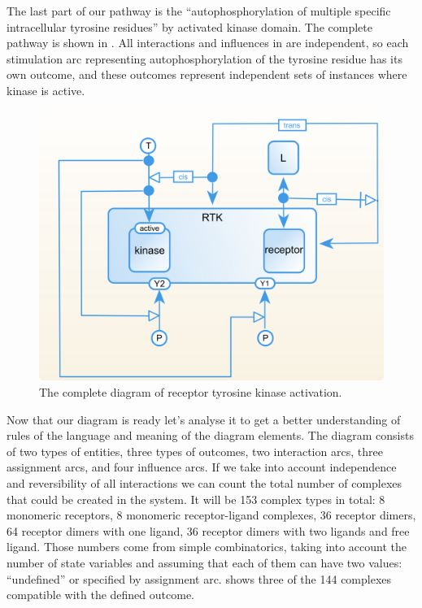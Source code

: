 The last part of our pathway is the ``autophosphorylation of multiple specific intracellular tyrosine residues'' by activated kinase domain. The complete pathway is shown in . All interactions and influences in \SBGNERLone are independent, so each stimulation arc representing autophosphorylation of the tyrosine residue has its own outcome, and these outcomes represent independent sets of instances where kinase is active.

\begin{figure}[H]
  \centering
  \vspace*{-0.75em}
  \includegraphics[scale=0.75]{examples/rtk.png}
   \caption{The complete diagram of receptor tyrosine kinase activation.}
  \label{fig:rtk-full}
\end{figure}

Now that our diagram is ready let's analyse it to get a better understanding of rules of the language and meaning of the diagram elements. The diagram consists of two types of entities, three types of outcomes, two interaction arcs, three assignment arcs, and four influence arcs. If we take into account independence and reversibility of all interactions we can count the total number of complexes that could be created in the system. It will be 153 complex types in total: 8 monomeric receptors, 8 monomeric receptor-ligand complexes, 36 receptor dimers, 64 receptor dimers with one ligand, 36 receptor dimers with two ligands and free ligand. Those numbers come from simple combinatorics, taking into account the number of state variables and assuming that each of them can have two values: ``undefined'' or specified by assignment arc.  shows three of the 144 complexes compatible with the defined outcome.


